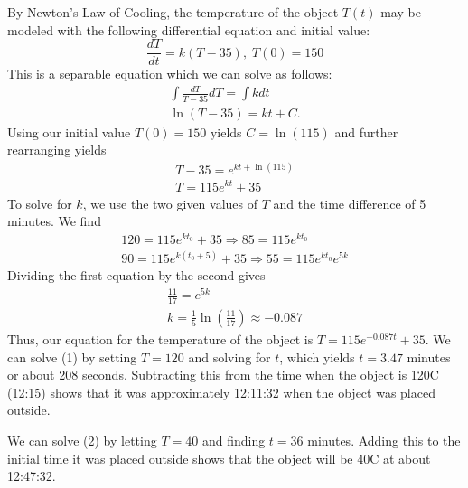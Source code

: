 \documentclass[11pt, titlepage]{article}
\begin{document}
  \begin{solution}
    By Newton's Law of Cooling, the temperature of the object \(T(t)\) may be modeled with the following differential equation and initial value:
    \begin{equation*}
      \frac{dT}{dt} = k (T - 35), \; T(0) = 150
    \end{equation*}
    This is a separable equation which we can solve as follows:
    \begin{gather*}
      \int \frac{dT}{T - 35} dT = \int k dt \\
      \ln(T - 35) = kt + C.
    \end{gather*}
    Using our initial value \(T(0) = 150\) yields \(C = \ln(115)\) and further rearranging yields
    \begin{gather*}
      T - 35 = e^{kt + \ln(115)} \\
      T = 115e^{kt} + 35
    \end{gather*}
    To solve for \(k\), we use the two given values of \(T\) and the time difference of 5 minutes.
    We find
    \begin{gather*}
      120 = 115e^{kt_{0}} + 35 \Longrightarrow 85 = 115e^{kt_{0}}\\
      90 = 115e^{k(t_{0}+5)} + 35 \Longrightarrow 55 = 115e^{kt_{0}}e^{5k}
    \end{gather*}
    Dividing the first equation by the second gives
    \begin{gather*}
      \frac{11}{17} = e^{5k} \\
      k = \frac{1}{5} \ln \left(\frac{11}{17} \right) \approx -0.087
    \end{gather*}
    Thus, our equation for the temperature of the object is \(T = 115e^{-0.087t} + 35\).
    We can solve (1) by setting \(T = 120\) and solving for \(t\), which yields \(t = 3.47\) minutes or about 208 seconds.
    Subtracting this from the time when the object is 120\degree C (12:15) shows that it was approximately 12:11:32 when the object was placed outside.

    We can solve (2) by letting \(T = 40\) and finding \(t = 36\) minutes.
    Adding this to the initial time it was placed outside shows that the object will be 40\degree C at about 12:47:32.
  \end{solution}
\end{document}
